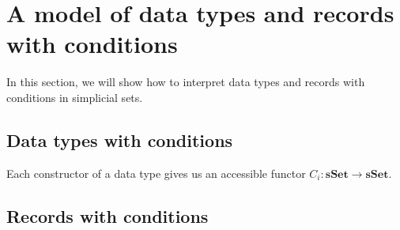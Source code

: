\documentclass{amsart}
\theoremstyle{definition}
\theoremstyle{remark}
\newcommand{\cat}[1]{\mathbf{#1}}
\newcommand{\sSet}{\cat{sSet}}
\numberwithin{figure}{section}
\begin{document}
\section{A model of data types and records with conditions}

In this section, we will show how to interpret data types and records with conditions in simplicial sets.

\subsection{Data types with conditions}

Each constructor of a data type gives us an accessible functor $C_i : \sSet \to \sSet$.


\subsection{Records with conditions}



\end{document}
